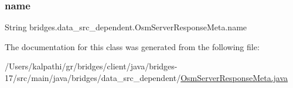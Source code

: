 \subsubsection{\texorpdfstring{name}{name}}
{\footnotesize\ttfamily String bridges.\+data\+\_\+src\+\_\+dependent.\+Osm\+Server\+Response\+Meta.\+name}



The documentation for this class was generated from the following file\+:\begin{DoxyCompactItemize}
\item 
/\+Users/kalpathi/gr/bridges/client/java/bridges-\/17/src/main/java/bridges/data\+\_\+src\+\_\+dependent/\mbox{\hyperlink{_osm_server_response_meta_8java}{Osm\+Server\+Response\+Meta.\+java}}\end{DoxyCompactItemize}
